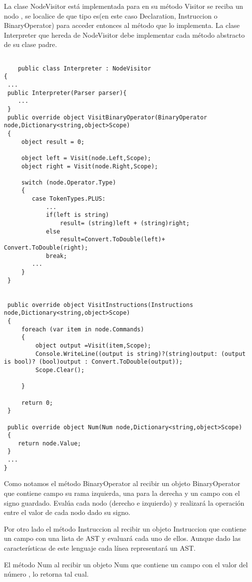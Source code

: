 \documentclass[a4paper,12pt]{article}
\begin{document}
 La clase NodeVisitor est\'a implementada para en su m\'etodo Visitor se reciba un nodo , se localice de que tipo es(en este caso Declaration, Instruccion o BinaryOperator) para acceder entonces al m\'etodo que lo implementa.
 La clase Interpreter que hereda de NodeVisitor debe implementar cada m\'etodo abstracto de su clase padre.
 \begin{lstlisting}[style=csharp]

    public class Interpreter : NodeVisitor
{
 ... 
 public Interpreter(Parser parser){
    ...
 }
 public override object VisitBinaryOperator(BinaryOperator node,Dictionary<string,object>Scope)
 {
     object result = 0;

     object left = Visit(node.Left,Scope);
     object right = Visit(node.Right,Scope);

     switch (node.Operator.Type)
     {
        case TokenTypes.PLUS:
            ... 
            if(left is string)
                result= (string)left + (string)right;
            else
                result=Convert.ToDouble(left)+ Convert.ToDouble(right);
            break;
        ...
     }
 }


 public override object VisitInstructions(Instructions node,Dictionary<string,object>Scope)
 {
     foreach (var item in node.Commands)
     {
         object output =Visit(item,Scope);
         Console.WriteLine((output is string)?(string)output: (output is bool)? (bool)output : Convert.ToDouble(output));
         Scope.Clear();

     }

     return 0;
 }

 public override object Num(Num node,Dictionary<string,object>Scope)
 {
    return node.Value;
 }
 ... 
}
 \end{lstlisting}

 Como notamos el m\'etodo BinaryOperator al recibir un objeto BinaryOperator que contiene campo su rama izquierda, una para la derecha y un campo con el signo guardado. 
 Eval\'ua cada nodo (derecho e izquierdo) y realizar\'a la operaci\'on entre el valor de cada nodo dado su signo.

Por otro lado el m\'etodo Instruccion al recibir un objeto Instruccion que contiene  un campo con una lista de AST y evaluar\'a cada uno de ellos. Aunque dado las caracter\'isticas de este lenguaje cada l\'inea representar\'a un AST.

El m\'etodo Num al recibir un objeto Num que contiene un campo con el valor del n\'umero , lo retorna tal cual.
\end{document}
